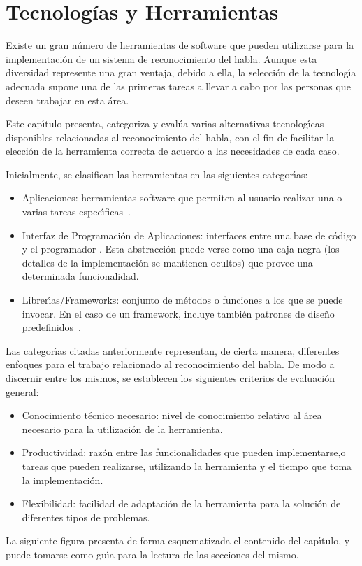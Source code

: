 \chapter{Tecnolog\'ias y Herramientas}
\label{sec:tecnologias}

Existe un gran n\'umero de herramientas de software que pueden utilizarse para la implementaci\'on de un
sistema de reconocimiento del habla. Aunque esta diversidad represente una gran ventaja,
debido a ella, la selecci\'on de la tecnolog{\'\i}a adecuada supone una de las primeras tareas a llevar a
cabo por las personas que deseen trabajar en esta \'area.

Este cap{\'\i}tulo presenta, categoriza y eval\'ua varias alternativas tecnolog{\'\i}cas disponibles relacionadas
al reconocimiento del habla, con el fin de facilitar la elecci\'on de la herramienta correcta
de acuerdo a las necesidades de cada caso.

Inicialmente, se clasifican las herramientas en las siguientes categor{\'\i}as:
\begin{itemize}
	\item Aplicaciones: herramientas software que permiten al usuario realizar una o
	varias tareas \mbox{espec{\'\i}ficas \cite{GoodwillComputer}}.
	\item Interfaz de Programaci\'on de Aplicaciones: interfaces entre una base de c\'odigo y
	el programador \cite{DoucetteOnApi}. Esta abstracci\'on puede verse como una caja negra
	(los detalles de la implementaci\'on se mantienen ocultos) que provee una determinada funcionalidad.
	\item Librer{\'\i}as/Frameworks: conjunto de m\'etodos o funciones a los que se puede invocar.
	En el caso de un framework, incluye tambi\'en patrones de dise\~no
	\mbox{predefinidos \cite{FowlerInversion}}.
\end{itemize}

Las categor{\'\i}as citadas anteriormente representan, de cierta manera, diferentes enfoques para el trabajo
relacionado al reconocimiento del habla. De modo a discernir entre los mismos, se establecen
los siguientes criterios de evaluaci\'on general:
\begin{itemize}
	\item Conocimiento t\'ecnico necesario: nivel de conocimiento relativo al \'area necesario para la
	utilizaci\'on de la herramienta.
	\item Productividad: raz\'on entre las funcionalidades que pueden implementarse,o tareas que pueden
	realizarse, utilizando la herramienta y el tiempo que toma la implementaci\'on.
	\item Flexibilidad: facilidad de adaptaci\'on de la herramienta para la soluci\'on de diferentes
	tipos de problemas.
\end{itemize}

La siguiente figura presenta de forma esquematizada el contenido del cap{\'\i}tulo, y puede tomarse como
gu{\'\i}a para la lectura de las secciones del mismo.





